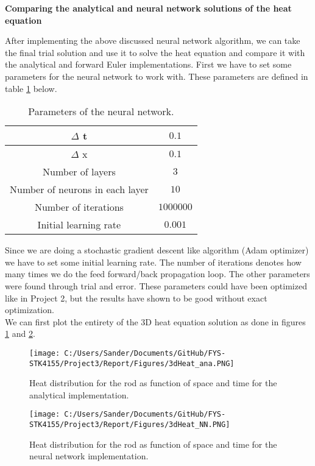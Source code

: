 \documentclass[12pt,a4paper]{article}
\begin{document}
\begin{center}
\large{\textbf{Comparing the analytical and neural network solutions of the heat equation}}
\end{center}

\noindent After implementing the above discussed neural network algorithm, we can take the final trial solution and use it to solve the heat equation and compare it with the analytical and forward Euler implementations. First we have to set some parameters for the neural network to work with. These parameters are defined in table \ref{tab:NNparams} below.

\begin{table}[h]
\caption{\label{tab:NNparams} Parameters of the neural network.}
\centering
\begin{tabular}{|c|c|}
\hline
$\Delta$ t & $0.1$\\
\hline
$\Delta$ x & $0.1$\\
\hline
Number of layers & $3$\\
\hline
Number of neurons in each layer & $10$\\
\hline
Number of iterations & $1000000$\\
\hline
Initial learning rate & $0.001$\\
\hline
\end{tabular}
\end{table}

\noindent Since we are doing a stochastic gradient descent like algorithm (Adam optimizer) we have to set some initial learning rate. The number of iterations denotes how many times we do the feed forward/back propagation loop. The other parameters were found through trial and error. These parameters could have been optimized like in Project 2, but the results have shown to be good without exact optimization.
\\
We can first plot the entirety of the 3D heat equation solution as done in figures \ref{fig:3dHeatAna} and \ref{fig:3dHeatNN}.

\begin{figure}[H]
\centering
\texttt{[image: C:/Users/Sander/Documents/GitHub/FYS-STK4155/Project3/Report/Figures/3dHeat\_ana.PNG]}
\caption{\label{fig:3dHeatAna} Heat distribution for the rod as function of space and time for the analytical implementation.}
\end{figure}

\begin{figure}[H]
\centering
\texttt{[image: C:/Users/Sander/Documents/GitHub/FYS-STK4155/Project3/Report/Figures/3dHeat\_NN.PNG]}
\caption{\label{fig:3dHeatNN} Heat distribution for the rod as function of space and time for the neural network implementation.}
\end{figure}
\end{document}
